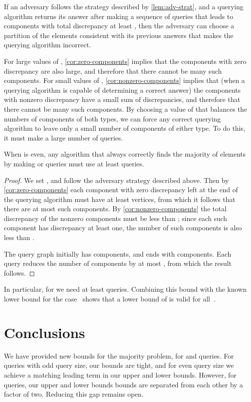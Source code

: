 \documentclass[11pt]{llncs}
\begin{document}
\begin{corollary}
\label{cor:nonzero-components}
If an adversary follows the strategy described by \autoref{lem:adv-strat}, and a querying algorithm returns its answer after making a sequence of queries that leads to components with total discrepancy at least , then the adversary can choose a partition of the elements consistent with its previous answers that makes the querying algorithm incorrect.
\end{corollary}

For large values of , \autoref{cor:zero-components} implies that the components with zero discrepancy are also large, and therefore that there cannot be many such components.
For small values of , \autoref{cor:nonzero-components} implies that (when a querying algorithm is capable of determining a correct answer) the components with nonzero discrepancy have a small sum of discrepancies, and therefore that there cannot be many such components.
By choosing a value of  that balances the numbers of components of both types,
we can force any correct querying algorithm to leave only a small number of components of either type. To do this, it must make a large number of queries.

\begin{theorem}
When  is even, any algorithm that always correctly finds the majority of  elements by making  or  queries must use at least  queries.
\end{theorem}

\begin{proof}
We set , and follow the adversary strategy described above.
Then by \autoref{cor:zero-components} each component with zero discrepancy left at the end of the querying algorithm must have at least  vertices, from which it follows that there are at most  such components. By \autoref{cor:nonzero-components} the total discrepancy of the nonzero components must be less than ; since each such component has discrepancy at least one, the number of such components is also less than .

The query graph initially has  components, and ends with  components.
Each query reduces the number of components by at most , from which the result follows.
\end{proof}

In particular, for  we need at least  queries. Combining this bound with the known  lower bound for the  case~\cite{SakWer-Comb-91} shows that a lower bound of  is valid for all~.
\fi

\section{Conclusions}
We have provided new bounds for the majority problem, for  and  queries. For  queries with odd query size, our bounds are tight, and for even query size we achieve a matching leading term in our upper and lower bounds. However,  for  queries, our upper and lower bounds bounds are separated from each other by a factor of two. Reducing this gap remains open.
\end{document}
